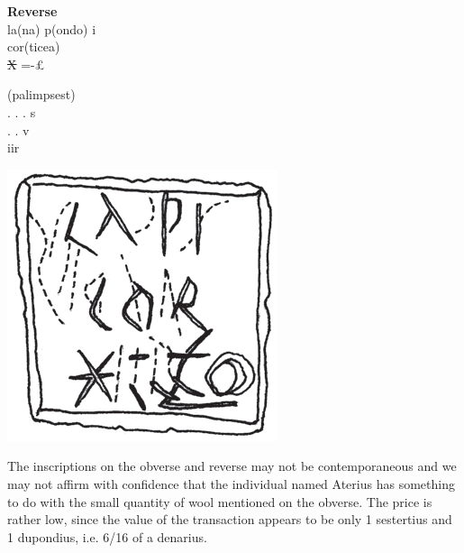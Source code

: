 \documentclass[amsthm,ebook]{saparticle}
\begin{document}
\begin{minipage}[t]{0.25\textwidth}
\textbf{Reverse}\\
la(na) p(ondo) i\\
cor(ticea)\\
\sout{X} =-\pounds\\
\end{minipage}
\begin{minipage}[t]{0.25\textwidth}
(palimpsest)\\
. . . s\\
. . v\\
  iir 
\end{minipage}
\begin{minipage}[c]{0.30\textwidth}
\includegraphics[width=\columnwidth]{EAGLE16lameetalteaching-img005b.png}
\end{minipage}


The inscriptions on the obverse and reverse may not be contemporaneous and we may not affirm with confidence that the
individual named Aterius has something to do with the small quantity of wool mentioned on the obverse. The price is
rather low, since the value of the transaction appears to be only 1 sestertius and 1 dupondius, i.e. 6/16 of a
denarius. 
\end{document}
